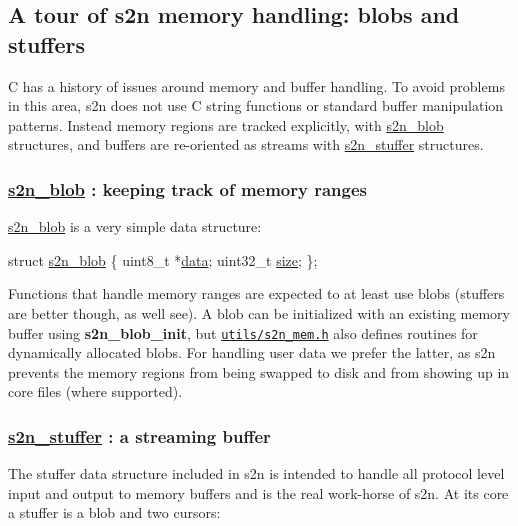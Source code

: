 \subsection*{A tour of s2n memory handling\+: blobs and stuffers}

C has a history of issues around memory and buffer handling. To avoid problems in this area, s2n does not use C string functions or standard buffer manipulation patterns. Instead memory regions are tracked explicitly, with \hyperlink{structs2n__blob}{s2n\+\_\+blob} structures, and buffers are re-\/oriented as streams with \hyperlink{structs2n__stuffer}{s2n\+\_\+stuffer} structures.

\subsubsection*{\hyperlink{structs2n__blob}{s2n\+\_\+blob} \+: keeping track of memory ranges}

\hyperlink{structs2n__blob}{s2n\+\_\+blob} is a very simple data structure\+:


\begin{DoxyCode}
\textcolor{keyword}{struct }\hyperlink{structs2n__blob}{s2n\_blob} \{
    uint8\_t *\hyperlink{structs2n__blob_abe222f6d3581e7920dcad5306cc906a8}{data};
    uint32\_t \hyperlink{structs2n__blob_ab2c6b258f02add8fdf4cfc7c371dd772}{size};
\};
\end{DoxyCode}


Functions that handle memory ranges are expected to at least use blobs (stuffers are better though, as we\textquotesingle{}ll see). A blob can be initialized with an existing memory buffer using {\bfseries s2n\+\_\+blob\+\_\+init}, but \href{https://github.com/awslabs/s2n/blob/master/utils/s2n_mem.h}{\tt utils/s2n\+\_\+mem.\+h} also defines routines for dynamically allocated blobs. For handling user data we prefer the latter, as s2n prevents the memory regions from being swapped to disk and from showing up in core files (where supported).

\subsubsection*{\hyperlink{structs2n__stuffer}{s2n\+\_\+stuffer} \+: a streaming buffer}

The stuffer data structure included in s2n is intended to handle all protocol level input and output to memory buffers and is the real work-\/horse of s2n. At its core a stuffer is a blob and two cursors\+:


